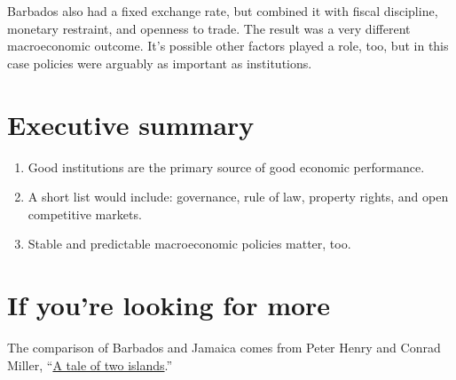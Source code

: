 Barbados also had a fixed exchange rate,
but combined it with fiscal discipline, monetary restraint,
and openness to trade.
The result was a very different macroeconomic outcome.
It's possible other factors played a role, too,
but in this case policies were arguably
as important as institutions.

\begin{comment}
\section{Other factors}

[??]

Democracy, resources, education,....

Summarize evidence.  Mention Barro, Easterly...

Cause or effect?
\end{comment}

\section*{Executive summary}

\begin{enumerate}
\item Good institutions are the primary source of good economic performance.
\item A short list would include:  governance, rule of law,
property rights, and open competitive markets.
\item Stable and predictable macroeconomic policies matter, too.
\end{enumerate}

\begin{comment}
\section*{Review questions}

\begin{enumerate}
\item ...
\end{enumerate}
\end{comment}

\section*{If you're looking for more}

The comparison of Barbados and Jamaica comes from Peter Henry and Conrad Miller,
``\href{{http://www.aeaweb.org/articles.php?doi=10.1257/aer.99.2.261}}
{A tale of two islands}.''

